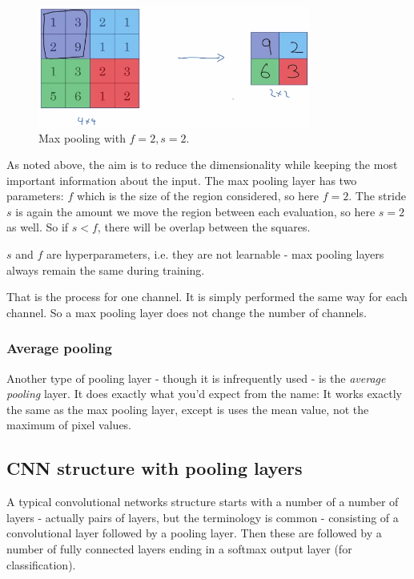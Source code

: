 \documentclass[12pt, a4paper]{article}
\numberwithin{equation}{section}
\begin{document}
\begin{figure}
\centering
\includegraphics[width=0.8\textwidth]{max_pooling}
\caption{Max pooling with $f=2, s=2$.}
\label{fig:max_pooling}
\end{figure}

As noted above, the aim is to reduce the dimensionality while keeping the most important information about the input. The max pooling layer has two parameters: $f$ which is the size of the region considered, so here $f=2$. The stride $s$ is again the amount we move the region between each evaluation, so here $s=2$ as well. So if $s<f$, there will be overlap between the squares.

$s$ and $f$ are hyperparameters, i.e. they are not learnable - max pooling layers always remain the same during training.

That is the process for one channel. It is simply performed the same way for each channel. So a max pooling layer does not change the number of channels.

\subsubsection{Average pooling}
Another type of pooling layer - though it is infrequently used - is the \textit{average pooling} layer. It does exactly what you'd expect from the name: It works exactly the same as the max pooling layer, except is uses the mean value, not the maximum of pixel values.

\subsection{CNN structure with pooling layers}
A typical convolutional networks structure starts with a number of a number of layers - actually pairs of layers, but the terminology is common - consisting of a convolutional layer followed by a pooling layer. Then these are followed by a number of fully connected layers ending in a softmax output layer (for classification).
\end{document}
